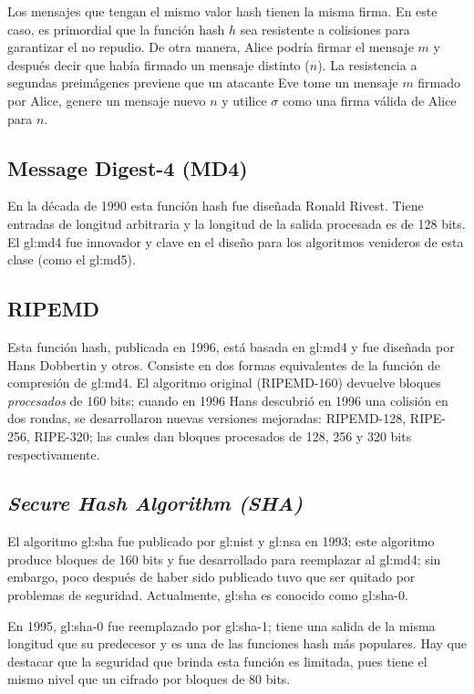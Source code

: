 Los mensajes que tengan el mismo valor hash tienen la misma firma. En
este caso, es primordial que la función hash $h$ sea resistente a
colisiones para garantizar el no repudio. De otra manera, Alice podría
firmar el mensaje $m$ y después decir que había firmado un mensaje
distinto ($n$).
La resistencia a segundas preimágenes previene que un atacante Eve tome
un mensaje $m$ firmado por Alice, genere un mensaje nuevo $n$ y utilice
$\sigma$ como una firma válida de Alice para $n$.

\subsection{Message Digest-4 (MD4)}
En la década de 1990 esta función hash fue diseñada Ronald Rivest.
Tiene entradas de longitud arbitraria y la longitud de la salida
procesada es de 128 bits. El \acrshort{gl:md4} fue innovador y
clave en el diseño para los algoritmos venideros de esta clase (como
el \acrshort{gl:md5}).

\subsection{RIPEMD}
Esta función hash, publicada en 1996, está basada en \acrshort{gl:md4} y fue
diseñada por Hans Dobbertin y otros. Consiste en dos formas equivalentes de la
función de compresión de \acrshort{gl:md4}. El algoritmo original (RIPEMD-160)
devuelve bloques \textit{procesados} de 160 bits; cuando en 1996 Hans
descubrió en 1996 una colisión en dos rondas, se desarrollaron nuevas versiones
mejoradas: RIPEMD-128, RIPE-256, RIPE-320; las cuales dan bloques procesados de
128, 256 y 320 bits respectivamente.

\subsection{\textit{Secure Hash Algorithm (SHA)}}
El algoritmo \acrshort{gl:sha} fue publicado por \acrshort{gl:nist} y
\acrshort{gl:nsa} en 1993; este algoritmo produce bloques de 160 bits y
fue desarrollado para reemplazar al \acrshort{gl:md4}; sin embargo, poco
después de haber sido publicado tuvo que ser quitado por problemas de
seguridad. Actualmente, \acrshort{gl:sha} es conocido como \acrshort{gl:sha}-0.

En 1995, \acrshort{gl:sha}-0 fue reemplazado por \acrshort{gl:sha}-1; tiene
una salida de la misma longitud que su predecesor y es una de las funciones
hash más populares. Hay que destacar que la seguridad que brinda esta función
es limitada, pues tiene el mismo nivel que un cifrado por bloques de 80 bits.

